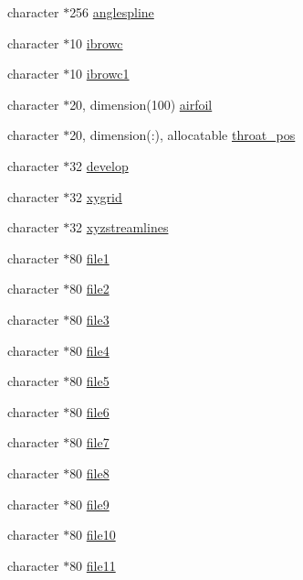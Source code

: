 \begin{DoxyCompactItemize}
\item 
character $\ast$256 \hyperlink{namespaceglobvar_a35d25dc36b9abbf2f578dcdb231ba86d}{anglespline}
\item 
character $\ast$10 \hyperlink{namespaceglobvar_a893ea8284df7ea110ea93d673cf237f9}{ibrowc}
\item 
character $\ast$10 \hyperlink{namespaceglobvar_a0a7f8083468e94d2d3aae1f309fb2dd4}{ibrowc1}
\item 
character $\ast$20, dimension(100) \hyperlink{namespaceglobvar_ae69735f940091c76c32c20b4cd90ebb4}{airfoil}
\item 
character $\ast$20, dimension(\+:), allocatable \hyperlink{namespaceglobvar_a8e9e3ba0b38e35c9b6b0c02e62ffc1f8}{throat\+\_\+pos}
\item 
character $\ast$32 \hyperlink{namespaceglobvar_acc5999ee5e843ad4d03a5047a316e813}{develop}
\item 
character $\ast$32 \hyperlink{namespaceglobvar_a32441db96414a17de3451c8789d1edb3}{xygrid}
\item 
character $\ast$32 \hyperlink{namespaceglobvar_a683af9844336d830d4c99a6f542260ad}{xyzstreamlines}
\item 
character $\ast$80 \hyperlink{namespaceglobvar_a914ee6e2252c7098aff0eb09f1646f79}{file1}
\item 
character $\ast$80 \hyperlink{namespaceglobvar_a95f5c32d6cc281292091a3f0c77928e2}{file2}
\item 
character $\ast$80 \hyperlink{namespaceglobvar_a50a9cac1bfd7e2b8ba993f2e494e61af}{file3}
\item 
character $\ast$80 \hyperlink{namespaceglobvar_ad37b1da3092de9a9a76be4f2f8c97231}{file4}
\item 
character $\ast$80 \hyperlink{namespaceglobvar_a2cf5ea09c434891e0a0154c05a3a55dc}{file5}
\item 
character $\ast$80 \hyperlink{namespaceglobvar_a1f007a363d48ae7b896f7303fb7b94c9}{file6}
\item 
character $\ast$80 \hyperlink{namespaceglobvar_aedb6df66bd85d51a0e7a4abaf0833074}{file7}
\item 
character $\ast$80 \hyperlink{namespaceglobvar_afe69a24b80357a46880b963d07e777f4}{file8}
\item 
character $\ast$80 \hyperlink{namespaceglobvar_ae35b72b87d0bb3063a6a44013250ce2a}{file9}
\item 
character $\ast$80 \hyperlink{namespaceglobvar_a6581bd3170639009e3b516cfef2969cf}{file10}
\item 
character $\ast$80 \hyperlink{namespaceglobvar_a8150c7754f44712fdeb69767f63ac557}{file11}

\end{DoxyCompactItemize}
